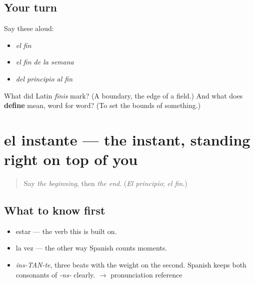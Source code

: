 \subsection*{Your turn}
Say these aloud:

\begin{itemize}
\raggedright
  \item \emph{el fin}
  \item \emph{el fin de la semana}
  \item \emph{del principio al fin}
\end{itemize}

\begin{tcolorbox}[breakable,colback=teal!4,colframe=teal!35!black,title={Before you move on}]
What did Latin \emph{fīnis} mark? (A boundary, the edge of a field.) And what does \textbf{define} mean, word for word? (To set the bounds of something.)
\end{tcolorbox}
\section[el instante]{el instante — the instant, standing right on top of you}

\label{lesson:ES-C348-instante}



\begin{quote}
Say \emph{the beginning}, then \emph{the end}. (\emph{El principio}; \emph{el fin}.)
\end{quote}

\subsection*{What to know first}
\begin{itemize}
\raggedright
  \item estar — the verb this is built on.
  \item la vez — the other way Spanish counts moments.
\end{itemize}

\begin{sounds}
\begin{itemize}
\raggedright
  \item \emph{ins-TAN-te}, three beats with the weight on the second. Spanish keeps both consonants of \emph{-ns-} clearly. $\to$ pronunciation reference
\end{itemize}
\end{sounds}

